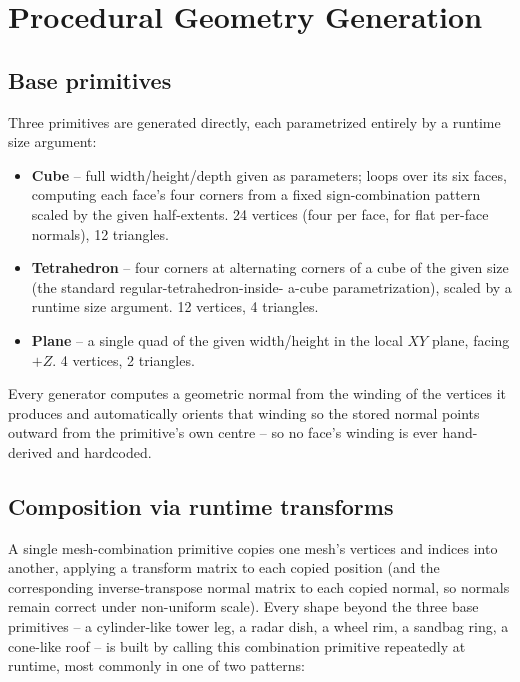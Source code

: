 \documentclass[11pt,a4paper]{article}
\begin{document}
\section{Procedural Geometry Generation}
\label{sec:geometry}

\subsection{Base primitives}
Three primitives are generated directly, each parametrized entirely by a
runtime size argument:

\begin{itemize}[nosep]
  \item \textbf{Cube} -- full width/height/depth given as parameters;
        loops over its six faces, computing each face's four corners
        from a fixed sign-combination pattern scaled by the given
        half-extents. 24 vertices (four per face, for flat per-face
        normals), 12 triangles.
  \item \textbf{Tetrahedron} -- four corners at alternating corners of a
        cube of the given size (the standard regular-tetrahedron-inside-
        a-cube parametrization), scaled by a runtime size argument. 12
        vertices, 4 triangles.
  \item \textbf{Plane} -- a single quad of the given width/height in the
        local $XY$ plane, facing $+Z$. 4 vertices, 2 triangles.
\end{itemize}

Every generator computes a geometric normal from the winding of the
vertices it produces and automatically orients that winding so the
stored normal points outward from the primitive's own centre -- so no
face's winding is ever hand-derived and hardcoded.

\subsection{Composition via runtime transforms}
A single mesh-combination primitive copies one mesh's vertices and
indices into another, applying a transform matrix to each copied
position (and the corresponding inverse-transpose normal matrix to each
copied normal, so normals remain correct under non-uniform scale). Every
shape beyond the three base primitives -- a cylinder-like tower leg, a
radar dish, a wheel rim, a sandbag ring, a cone-like roof -- is built by
calling this combination primitive repeatedly at runtime, most commonly
in one of two patterns:
\end{document}

